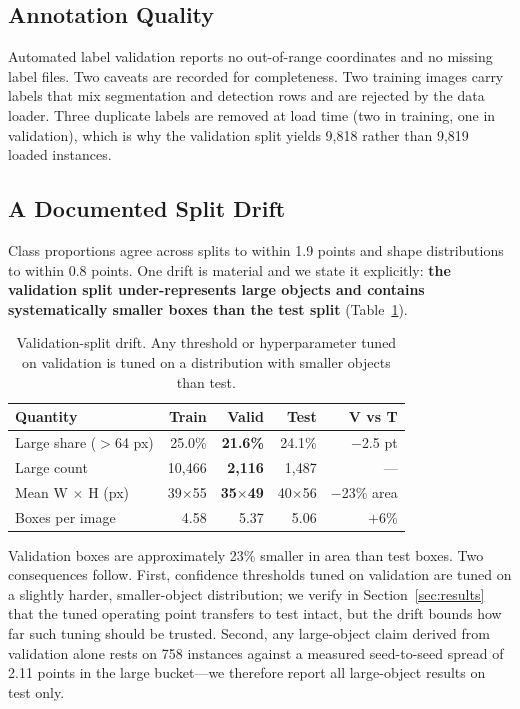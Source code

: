\documentclass[10pt,twocolumn,a4paper]{article}
\begin{document}
\subsection{Annotation Quality}

Automated label validation reports no out-of-range coordinates and no missing
label files. Two caveats are recorded for completeness. Two training images carry
labels that mix segmentation and detection rows and are rejected by the data
loader. Three duplicate labels are removed at load time (two in training, one in
validation), which is why the validation split yields 9{,}818 rather than 9{,}819
loaded instances.

\subsection{A Documented Split Drift}

Class proportions agree across splits to within 1.9 points and shape
distributions to within 0.8 points. One drift is material and we state it
explicitly: \textbf{the validation split under-represents large objects and
contains systematically smaller boxes than the test split}
(Table~\ref{tab:drift}).

\begin{table}[t]
\centering
\caption{Validation-split drift. Any threshold or hyperparameter tuned on
validation is tuned on a distribution with smaller objects than test.}
\label{tab:drift}
\small
\begin{tabular}{@{}lrrrr@{}}
\toprule
\textbf{Quantity} & \textbf{Train} & \textbf{Valid} & \textbf{Test} & \textbf{V vs T} \\
\midrule
Large share ($>$64 px) & 25.0\% & \textbf{21.6\%} & 24.1\% & $-$2.5 pt \\
Large count            & 10{,}466 & \textbf{2{,}116} & 1{,}487 & --- \\
Mean W $\times$ H (px) & 39$\times$55 & \textbf{35$\times$49} & 40$\times$56 & $-$23\% area \\
Boxes per image     & 4.58 & 5.37 & 5.06 & $+$6\% \\
\bottomrule
\end{tabular}
\end{table}

Validation boxes are approximately 23\% smaller in area than test boxes. Two
consequences follow. First, confidence thresholds tuned on validation are tuned
on a slightly harder, smaller-object distribution; we verify in
Section~\ref{sec:results} that the tuned operating point transfers to test intact,
but the drift bounds how far such tuning should be trusted. Second, any
large-object claim derived from validation alone rests on 758 instances against a
measured seed-to-seed spread of 2.11 points in the large bucket---we therefore
report all large-object results on test only.
\end{document}

